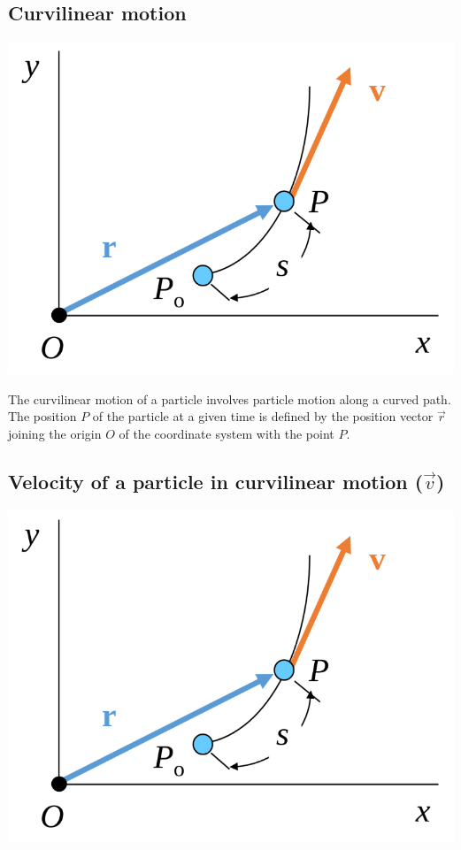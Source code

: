 \documentclass[11pt]{article}
\begin{document}
 \newpage

\subsection{Curvilinear motion}
\label{sec:orgf8e96f3}
\begin{center}
\includegraphics[width=.9\linewidth]{./images/curvilinear-motion-of-particle.png}
\end{center}

The curvilinear motion of a particle involves particle motion along a curved path. The position \(P\) of the particle at a given time is defined by the position vector \(\vec{r}\) joining the origin \(O\) of the coordinate system with the point \(P\).

\subsection{Velocity of a particle in curvilinear motion (\(\vec{v}\))}
\label{sec:org0fa8194}
\begin{center}
\includegraphics[width=.9\linewidth]{./images/curvilinear-motion-of-particle.png}
\end{center}
\end{document}
